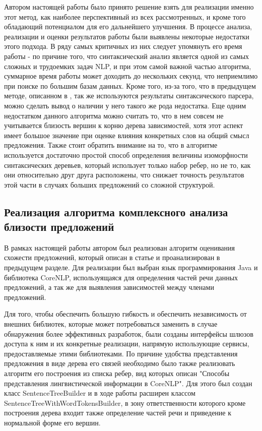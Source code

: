 Автором настоящей работы было принято решение взять для реализации именно этот метод,
как наиболее перспективный из всех рассмотренных, и кроме того обладающий
потенциалом для его дальнейшего улучшения.
В процессе анализа, реализации и оценки результатов работы были выявлены
некоторые недостатки этого подхода.
В ряду самых критичных из них следует упомянуть его время работы - 
по причине того, что синтаксический анализ является одной из самых
сложных и трудоемких задач NLP, и при этом самой важной частью алгоритма,
суммарное время работы может доходить до нескольких секунд,
что неприемлимо при поиске по большим базам данных.
Кроме того, из-за того, что в предыдущем методе, описанном в \cite{weightedDep},
так же используются результаты синтаксического парсера, можно сделать вывод
о наличии у него такого же рода недостатка.
Еще одним недостатком данного алгоритма можно считать то, что в нем совсем
не учитывается близость вершин к корню дерева зависимостей, хотя этот аспект
имеет большое значение при оценке влияния конкретных слов на общий смысл
предложения.
Также стоит обратить внимание на то, что в алгоритме
используется достаточно простой способ определения величины изоморфности
синтаксических деревьев, который использует только набор ребер, но не то,
как они относительно друг друга расположены, что снижает точность
результатов этой части в случаях больших предложений со сложной структурой.

\subsection{Реализация алгоритма комплексного анализа близости предложений}
В рамках настоящей работы автором был реализован алгоритм оценивания
схожести предложений, который описан в статье\cite{complexSim} и
проанализирован в предыдущем разделе.
Для реализации был выбран язык программирования Java и библиотека CoreNLP\cite{corenlp},
используящаяся для определения частей речи данных предложений, а так же для выявления зависимостей
между членами предложений.

Для того, чтобы обеспечить большую гибкость и обеспечить независимость от внешних библиотек,
которые может потребоваться заменить в случае обнаружения более эффективных разработок,
были созданы интерфейсы шлюзов доступа к ним и их конкретные реализации, напрямую
использующие сервисы, предоставляемые этими библиотеками.
По причине удобства представления предложения в виде дерева его связей
необходимо было также реализовать алгоритм его построения из списка ребер, 
вид которых описан "Способы представления лингвистической информации в CoreNLP".
Для этого был создан класс SentenceTreeBuilder и в ходе работы расширен
классом SentenceTreeWithWordTokensBuilder, в зону ответственности которого
кроме построения дерева входит также определение частей речи и приведение к нормальной форме
его вершин.

